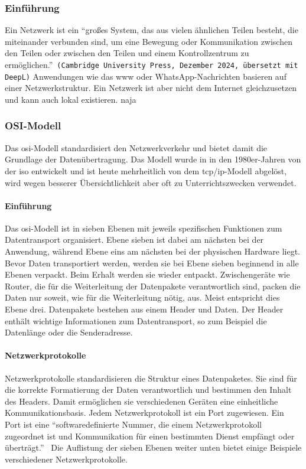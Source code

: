\documentclass[11pt, a4paper]{article}
\begin{document}
\subsubsection{Einführung}
Ein Netzwerk ist ein ``großes System, das aus vielen ähnlichen Teilen besteht, die miteinander verbunden sind, um eine Bewegung oder Kommunikation zwischen den Teilen oder zwischen den Teilen und einem Kontrollzentrum zu ermöglichen.''~\texttt{(Cambridge University Press, Dezember 2024, übersetzt mit DeepL)} Anwendungen wie das \gls{www} oder WhatsApp-Nachrichten basieren auf einer Netzwerkstruktur. Ein Netzwerk ist aber nicht dem Internet gleichzusetzen und kann auch lokal existieren. naja

\subsubsection{OSI-Modell}\label{subsubsec:osimodell}
Das \gls{osi}-Modell standardisiert den Netzwerkverkehr und bietet damit die Grundlage der Datenübertragung. Das Modell wurde in in den 1980er-Jahren von der \gls{iso} entwickelt und ist heute mehrheitlich von dem \gls{tcp}/\gls{ip}-Modell abgelöst, wird wegen besserer Übersichtlichkeit aber oft zu Unterrichtszwecken verwendet.~\cite{OSImodelWikipedia:online}
\paragraph{Einführung}
Das \gls{osi}-Modell ist in sieben Ebenen mit jeweils spezifischen Funktionen zum Datentransport organisiert. Ebene sieben ist dabei am nächsten bei der Anwendung, während Ebene eins am nächsten bei der physischen Hardware liegt. Bevor Daten transportiert werden, werden sie bei Ebene sieben beginnend in alle Ebenen verpackt. Beim Erhalt werden sie wieder entpackt. Zwischengeräte wie Router, die für die Weiterleitung der Datenpakete verantwortlich sind, packen die Daten nur soweit, wie für die Weiterleitung nötig, aus. Meist entspricht dies Ebene drei. Datenpakete bestehen aus einem Header und Daten. Der Header enthält wichtige Informationen zum Datentransport, so zum Beispiel die Datenlänge oder die Senderadresse. 
\paragraph{Netzwerkprotokolle}
Netzwerkprotokolle standardisieren die Struktur eines Datenpaketes. Sie sind für die korrekte Formatierung der Daten verantwortlich und bestimmen den Inhalt des Headers. Damit ermöglichen sie verschiedenen Geräten eine einheitliche Kommunikationsbasis. Jedem Netzwerkprotokoll ist ein Port zugewiesen. Ein Port ist eine ``softwaredefinierte Nummer, die einem Netzwerkprotokoll zugeordnet ist und Kommunikation für einen bestimmten Dienst empfängt oder überträgt.''~\cite{WasistPo:online} Die Auflistung der sieben Ebenen weiter unten bietet einige Beispiele verschiedener Netzwerkprotokolle.
\end{document}
